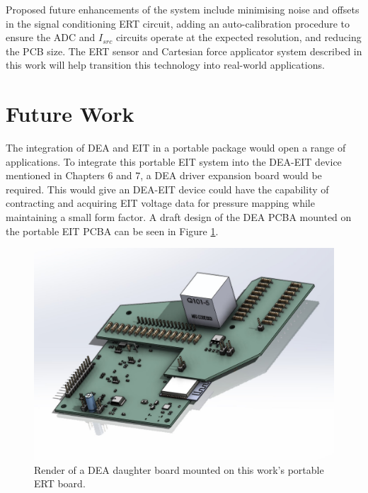 Proposed future enhancements of the system include minimising noise and offsets in the signal conditioning ERT circuit, adding an auto-calibration procedure to ensure the ADC and $I_{src}$ circuits operate at the expected resolution, and reducing the PCB size. 
The ERT sensor and Cartesian force applicator system described in this work will help transition this technology into real-world applications.

\section{Future Work}
The integration of DEA and EIT in a portable package would open a range of applications. To integrate this portable EIT system into the DEA-EIT device mentioned in Chapters 6 and 7, a DEA driver expansion board would be required. This would give an DEA-EIT device could have the capability of contracting and acquiring EIT voltage data for pressure mapping while maintaining a small form factor. A draft design of the DEA PCBA mounted on the portable EIT PCBA can be seen in Figure \ref{fig:DEA-EIT_draft_pcb_assy}. 
\begin{figure}[H]
	\centering
	\includegraphics[width=0.55\linewidth]{Figures/DEA-EIT_mother-daughter_board_draft.jpg}
	\caption{Render of a DEA daughter board mounted on this work's portable ERT board.}
	\label{fig:DEA-EIT_draft_pcb_assy}
\end{figure}